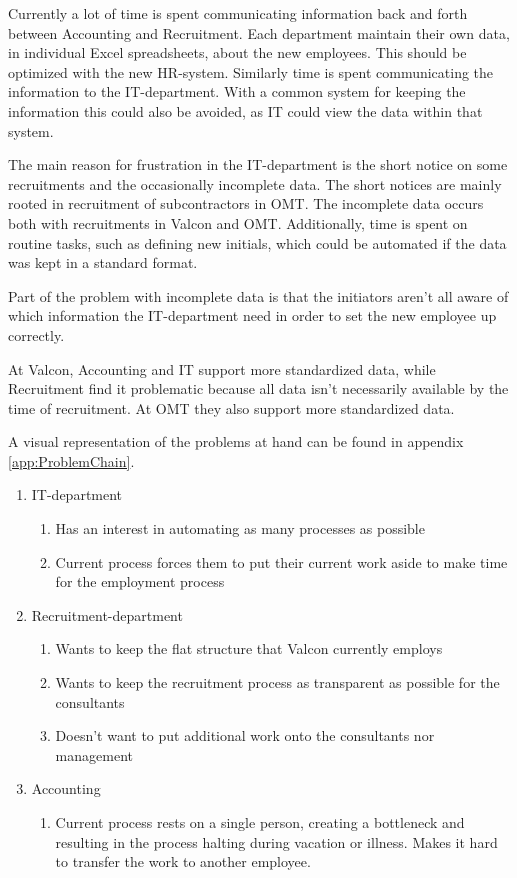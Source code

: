 Currently a lot of time is spent communicating information back and forth between Accounting and Recruitment. 
Each department maintain their own data, in individual Excel spreadsheets, about the new employees. 
This should be optimized with the new HR-system.
Similarly time is spent communicating the information to the IT-department.
With a common system for keeping the information this could also be avoided, as IT could view the data within that system.

The main reason for frustration in the IT-department is the short notice on some recruitments and the occasionally incomplete data.
The short notices are mainly rooted in recruitment of subcontractors in OMT.
The incomplete data occurs both with recruitments in Valcon and OMT.
Additionally, time is spent on routine tasks, such as defining new initials, which could be automated if the data was kept in a standard format.

Part of the problem with incomplete data is that the initiators aren't all aware of which information the IT-department need in order to set the new employee up correctly.

At Valcon, Accounting and IT support more standardized data, while Recruitment find it problematic because all data isn't necessarily available by the time of recruitment.
At OMT they also support more standardized data.

A visual representation of the problems at hand can be found in appendix \ref{app:ProblemChain}.


\begin{enumerate}
	\item IT-department
	\begin{enumerate}
		\item Has an interest in automating as many processes as possible
		\item Current process forces them to put their current work aside to make time for the employment process
	\end{enumerate}
	\item Recruitment-department
	\begin{enumerate}
		\item Wants to keep the flat structure that Valcon currently employs
		\item Wants to keep the recruitment process as transparent as possible for the consultants
		\item Doesn't want to put additional work onto the consultants nor management
	\end{enumerate}
	\item Accounting
	\begin{enumerate}
		\item Current process rests on a single person, creating a bottleneck and resulting in the process halting during vacation or illness. Makes it hard to transfer the work to another employee.
	\end{enumerate}
	
\end{enumerate}